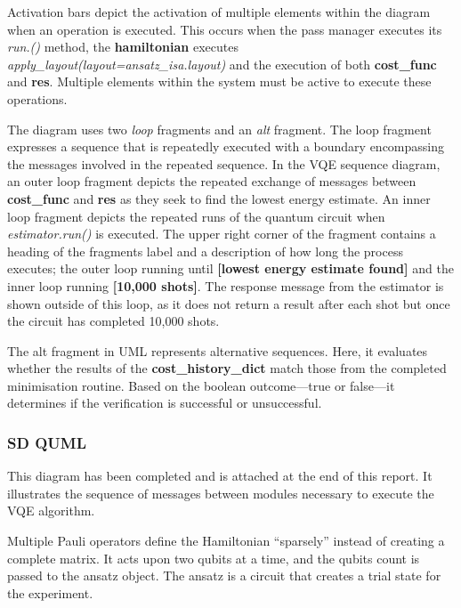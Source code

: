 \documentclass{article}
\begin{document}
Activation bars depict the activation of multiple elements within the diagram when an operation is executed\cite{creatley}. This occurs when the pass manager executes its \textit{run.()} method, the  \textbf{hamiltonian} executes \textit{apply\_layout(layout=ansatz\_isa.layout)} and the execution of both \textbf{cost\_func} and \textbf{res}. Multiple elements within the system must be active to execute these operations.

The diagram uses two \textit{loop} fragments and an \textit{alt} fragment. The loop fragment expresses a sequence that is repeatedly executed\cite{Seidl_Scholz_Huemer_Kappel_Duffy_2014} with a boundary encompassing the messages involved in the repeated sequence. In the VQE sequence diagram, an outer loop fragment depicts the repeated exchange of messages between \textbf{cost\_func} and \textbf{res} as they seek to find the lowest energy estimate. An inner loop fragment depicts the repeated runs of the quantum circuit when \textit{estimator.run()} is executed. The upper right corner of the fragment contains a heading of the fragments label and a description of how long the process executes; the outer loop running until \textbf{[lowest energy estimate found]} and the inner loop running \textbf{[10,000 shots]}. The response message from the estimator is shown outside of this loop, as it does not return a result after each shot but once the circuit has completed 10,000 shots. 

The alt fragment in UML represents alternative sequences\cite{Seidl_Scholz_Huemer_Kappel_Duffy_2014}. Here, it evaluates whether the results of the \textbf{cost\_history\_dict} match those from the completed minimisation routine. Based on the boolean outcome—true or false—it determines if the verification is successful or unsuccessful.

\subsubsection{SD QUML}

This diagram has been completed and is attached at the end of this report. It illustrates the sequence of messages between modules necessary to execute the VQE algorithm. 

Multiple Pauli operators define the Hamiltonian “sparsely” instead of creating a complete matrix. It acts upon two qubits at a time, and the qubits count is passed to the ansatz object. The ansatz is a circuit that creates a trial state for the experiment. 
\end{document}
